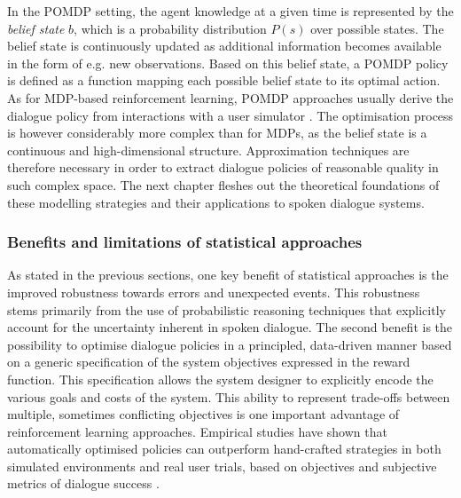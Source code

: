 In the POMDP setting, the agent knowledge at a given time is represented by the \textit{belief state} $b$, which is a probability distribution $P(s)$ over possible states.  The belief state is continuously updated as additional information becomes available in the form of e.g. new observations. Based on this belief state, a POMDP policy is defined as a function mapping each possible belief state to its optimal action.  As for MDP-based reinforcement learning, POMDP approaches usually derive the dialogue policy from interactions with a user simulator  \citep{Young:2010,Thomson:2010:BUD:1772996.1773040, daubigney2012}. The optimisation process is however considerably more complex than for MDPs, as the belief state is a continuous and high-dimensional structure. Approximation techniques are therefore necessary in order to extract dialogue policies of reasonable quality in such complex space. The next chapter fleshes out the theoretical foundations of these modelling strategies and their applications to spoken dialogue systems.

\subsubsection*{Benefits and limitations of statistical approaches}


As stated in the previous sections, one key benefit of statistical approaches is the improved robustness towards errors and unexpected events. This robustness stems primarily from the use of probabilistic reasoning techniques that explicitly account for the uncertainty inherent in spoken dialogue.  The second benefit is the possibility to optimise dialogue policies in a principled, data-driven manner based on a generic specification of the system objectives expressed in the reward function.  This specification allows the system designer to explicitly encode the various goals and costs of the system. This ability to represent trade-offs between multiple, sometimes conflicting objectives is one important advantage of reinforcement learning approaches.  Empirical studies have shown that automatically optimised policies can outperform hand-crafted strategies in both simulated environments and  real user trials, based on objectives and subjective metrics of dialogue success \citep{Supelec270,6407655}. 

